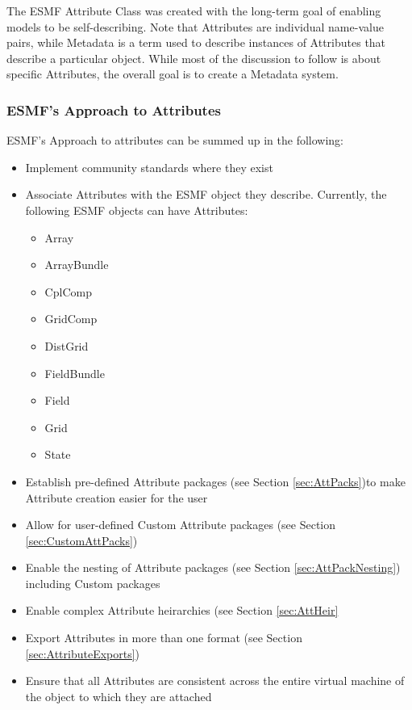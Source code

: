 %


The ESMF Attribute Class was created with the long-term goal of enabling models to be self-describing. Note that Attributes are individual name-value pairs, while Metadata is a term used to describe instances of Attributes that describe a particular object. While most of the discussion to follow is about specific Attributes, the overall goal is to create a Metadata system.   

\subsubsection{ESMF's Approach to Attributes}

ESMF's Approach to attributes can be summed up in the following:

\begin{itemize}
  \item Implement community standards where they exist
  \item Associate Attributes with the ESMF object they describe. Currently, the following ESMF objects can have Attributes:
  \begin{itemize}
     \item Array
     \item ArrayBundle
     \item CplComp
     \item GridComp
     \item DistGrid
     \item FieldBundle
     \item Field
     \item Grid
     \item State
     \end{itemize}
  \item Establish pre-defined Attribute packages (see Section \ref{sec:AttPacks})to make Attribute creation easier for the user
  \item Allow for user-defined Custom Attribute packages (see Section \ref{sec:CustomAttPacks})
  \item Enable the nesting of Attribute packages (see Section \ref{sec:AttPackNesting}) including Custom packages
  \item Enable complex Attribute heirarchies (see Section \ref{sec:AttHeir}
  \item Export Attributes in more than one format (see Section \ref{sec:AttributeExports})
  \item Ensure that all Attributes are consistent across the entire virtual machine of the object to which they are attached  
\end{itemize}

